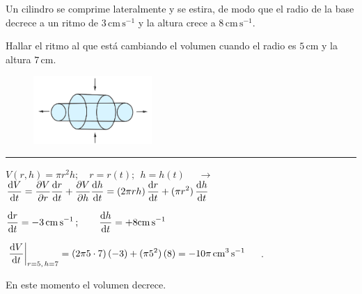 \vspace{1cm}
\begin{miejercicio}

\begin{multicols}{2}
Un cilindro se comprime lateralmente y se estira, de modo que el radio de la base decrece a un ritmo de $3\,  \mathrm{cm\,s}^{-1}$ y la altura crece a $8\, \mathrm{cm\,s}^{-1}$. 

	\vspace{3mm} Hallar el ritmo al que está cambiando el volumen cuando el radio es $5\, \mathrm{cm}$ y la altura $7\, \mathrm{cm}$.	

\begin{figure}[H]
	\centering
	\includegraphics[width=0.4\textwidth]{imagenes/T02IM06.png}
	\end{figure}

\end{multicols}	

\vspace{-5mm}
\color{teal!80}
\rule{200pt}{0.2pt}
\color{black}
\vspace{5mm}

$\displaystyle V(r,h)=\pi r^2 h; \quad r=r(t);\ \ h=h(t)$
$\quad \to \quad $
$\displaystyle \dv{V}{t}= \pdv{V}{r}\dv{r}{t}+\pdv{V}{h}\dv{h}{t}=(2\pi rh)\, \dv{r}{t}+(\pi r^2)\, \dv{h}{t}$

\vspace{3mm} $\displaystyle \dv{r}{t}=-3\,  \mathrm{cm}\,\mathrm{s}^{-1}\, ; \qquad \dv{h}{t}=+8  \mathrm{cm}\,\mathrm{s}^{-1}$

\vspace{3mm} $\displaystyle \eval{\dv{V}{t}}_{r=5,\, h=7} = (2\pi 5\cdot 7)\, (-3) + (\pi 5^2)\, (8)=-10\pi \, \mathrm{cm^3}\,\mathrm{s}^{-1}\quad $ .

\vspace{2mm} En este momento el volumen decrece.
\end{miejercicio}




